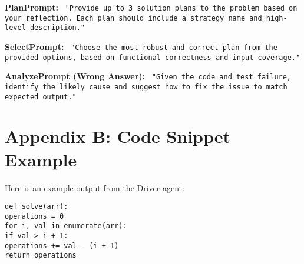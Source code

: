 \documentclass[11pt,a4paper]{article}
\begin{document}
\textbf{PlanPrompt:} \
\texttt{"Provide up to 3 solution plans to the problem based on your reflection. Each plan should include a strategy name and high-level description."}

\textbf{SelectPrompt:} \
\texttt{"Choose the most robust and correct plan from the provided options, based on functional correctness and input coverage."}

\textbf{AnalyzePrompt (Wrong Answer):} \
\texttt{"Given the code and test failure, identify the likely cause and suggest how to fix the issue to match expected output."}

\section{Appendix B: Code Snippet Example}
Here is an example output from the Driver agent:
\begin{verbatim}
def solve(arr):
operations = 0
for i, val in enumerate(arr):
if val > i + 1:
operations += val - (i + 1)
return operations
\end{verbatim}


\end{document}
